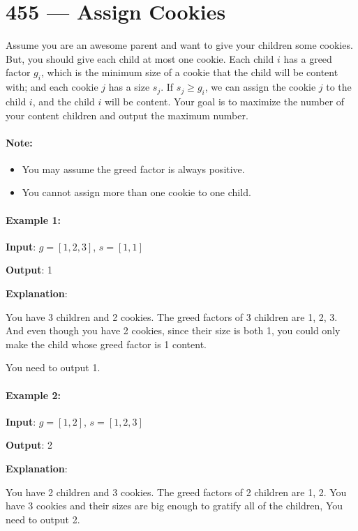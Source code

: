 \section{455 --- Assign Cookies}
Assume you are an awesome parent and want to give your children some cookies. But, you should give each child at most one cookie. Each child $i$ has a greed factor $g_i$, which is the minimum size of a cookie that the child will be content with; and each cookie $j$ has a size $s_j$. If $s_j \geq g_i$, we can assign the cookie $j$ to the child $i$, and the child $i$ will be content. Your goal is to maximize the number of your content children and output the maximum number.

\paragraph{Note:}
\begin{itemize}
\item You may assume the greed factor is always positive.
\item You cannot assign more than one cookie to one child.
\end{itemize}


\paragraph{Example 1:}

\begin{flushleft}
\textbf{Input}: $g=[1,2,3]$, $s=[1,1]$

\textbf{Output}: 1

\textbf{Explanation}: 

You have 3 children and 2 cookies. The greed factors of 3 children are 1, 2, 3. And even though you have 2 cookies, since their size is both 1, you could only make the child whose greed factor is 1 content.

You need to output 1.
\end{flushleft}

\paragraph{Example 2:}

\begin{flushleft}
\textbf{Input}: $g=[1,2]$, $s=[1,2,3]$

\textbf{Output}: 2

\textbf{Explanation}: 

You have 2 children and 3 cookies. The greed factors of 2 children are 1, 2. You have 3 cookies and their sizes are big enough to gratify all of the children, You need to output 2.
\end{flushleft}

